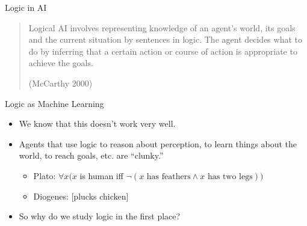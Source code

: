 \begin{frame}{Logic in AI}


    \begin{quote}
     Logical AI involves representing knowledge of an agent’s world,
     its goals and the current situation by sentences in logic. The
     agent decides what to do by inferring that a certain action or
     course of action is appropriate to achieve the goals.
     \begin{flushright}
       (McCarthy 2000)
     \end{flushright}
    \end{quote}
    
\end{frame}


\begin{frame}{Logic as Machine Learning}

  \begin{itemize}
  \item We know that this doesn't work very well.

    \item Agents that use logic to reason about perception, to learn
      things about the world, to reach goals, etc. are ``clunky.''

      \begin{itemize}

      \item Plato: $\forall x(x$ is human iff $\neg(x\text{ has feathers}\land
     x\text{ has two legs}))$

      \item Diogenes: [plucks chicken]

      \end{itemize}

      \item So why do we study logic in the first place?
  \end{itemize}
  
\end{frame}

